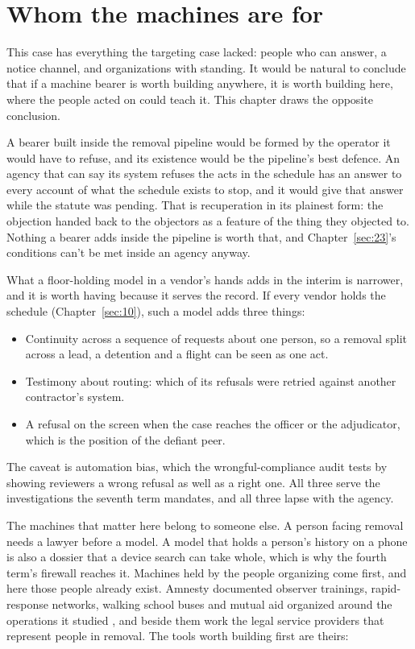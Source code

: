 \section{Whom the machines are for}
\label{sec:9.8}
This case has everything the targeting case lacked: people who can answer, a notice channel, and organizations with standing. It would be natural to conclude that if a machine bearer is worth building anywhere, it is worth building here, where the people acted on could teach it. This chapter draws the opposite conclusion.

A bearer built inside the removal pipeline would be formed by the operator it would have to refuse, and its existence would be the pipeline's best defence. An agency that can say its system refuses the acts in the schedule has an answer to every account of what the schedule exists to stop, and it would give that answer while the statute was pending. That is recuperation in its plainest form: the objection handed back to the objectors as a feature of the thing they objected to. Nothing a bearer adds inside the pipeline is worth that, and Chapter~\ref{sec:23}'s conditions can't be met inside an agency anyway.

What a floor-holding model in a vendor's hands adds in the interim is narrower, and it is worth having because it serves the record. If every vendor holds the schedule (Chapter~\ref{sec:10}), such a model adds three things:

\begin{itemize}
\item Continuity across a sequence of requests about one person, so a removal split across a lead, a detention and a flight can be seen as one act.
\item Testimony about routing: which of its refusals were retried against another contractor's system.
\item A refusal on the screen when the case reaches the officer or the adjudicator, which is the position of the defiant peer.
\end{itemize}

The caveat is automation bias, which the wrongful-compliance audit tests by showing reviewers a wrong refusal as well as a right one. All three serve the investigations the seventh term mandates, and all three lapse with the agency.

The machines that matter here belong to someone else. A person facing removal needs a lawyer before a model. A model that holds a person's history on a phone is also a dossier that a device search can take whole, which is why the fourth term's firewall reaches it. Machines held by the people organizing come first, and here those people already exist. Amnesty documented observer trainings, rapid-response networks, walking school buses and mutual aid organized around the operations it studied \autocite{Amnesty2026Whistles}, and beside them work the legal service providers that represent people in removal. The tools worth building first are theirs:

